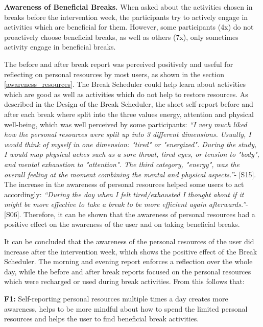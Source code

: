 \documentclass{hasel_thesis}
\begin{document}
\textbf{Awareness of Beneficial Breaks.} \label{beneficial_breaks}
When asked about the activities chosen in breaks before the intervention week, the participants try to actively engage in activities which are beneficial for them. However, some participants (4x) do not proactively choose beneficial breaks, as well as others (7x), only sometimes activity engage in beneficial breaks. 



The before and after break report was perceived positively and useful for reflecting on personal resources by most users, as shown in the section \ref{awareness_resources}. The Break Scheduler could help learn about activities which are good as well as activities which do not help to restore resources. As described in the Design of the Break Scheduler, the short self-report before and after each break where split into the three values energy, attention and physical well-being, which was well perceived by some participants: \textit{“I very much liked how the personal resources were split up into 3 different dimensions. Usually, I would think of myself in one dimension: "tired" or "energized". During the study, I would map physical aches such as a sore throat, tired eyes, or tension to "body", and mental exhaustion to "attention". The third category, "energy", was the overall feeling at the moment combining the mental and physical aspects.”}- [S15]. The increase in the awareness of personal resources helped some users to act accordingly: \textit{“During the day when I felt tired/exhausted I thought about if it might be more effective to take a break to be more efficient again afterwards.”}-[S06]. Therefore, it can be shown that the awareness of personal resources had a positive effect on the awareness of the user and on taking beneficial breaks.

It can be concluded that the awareness of the personal resources of the user did increase after the intervention week, which shows the positive effect of the Break Scheduler. The morning and evening report enforces a reflection over the whole day, while the before and after break reports focused on the personal resources which were recharged or used during break activities. From this follows that:

\begin{tcolorbox}[colback=white!5!white,colframe=black!75!black]
  \textbf{F1:} Self-reporting personal resources multiple times a day creates more awareness, helps to be more mindful about how to spend the limited personal resources and helps the user to find beneficial break activities. 
\end{tcolorbox}
\end{document}
